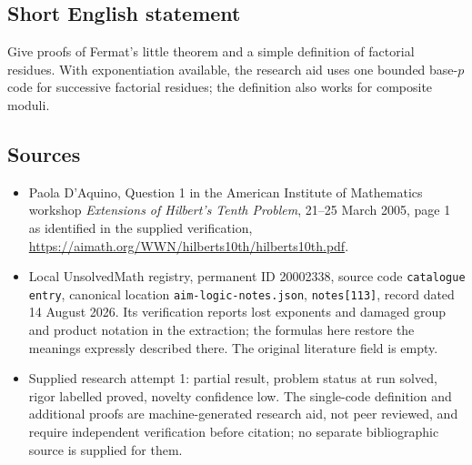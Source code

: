 \documentclass[11pt]{article}
\begin{document}
\subsection{Short English statement}
Give proofs of Fermat's little theorem and a simple definition of factorial residues. With exponentiation available, the research aid uses one bounded base-$p$ code for successive factorial residues; the definition also works for composite moduli.
\subsection{Sources}
\begin{itemize}
\item Paola D'Aquino, Question 1 in the American Institute of Mathematics workshop \emph{Extensions of Hilbert's Tenth Problem}, 21--25 March 2005, page 1 as identified in the supplied verification, \url{https://aimath.org/WWN/hilberts10th/hilberts10th.pdf}.
\item Local UnsolvedMath registry, permanent ID 20002338, source code \texttt{catalogue entry}, canonical location \texttt{aim-logic-notes.json}, \texttt{notes[113]}, record dated 14 August 2026. Its verification reports lost exponents and damaged group and product notation in the extraction; the formulas here restore the meanings expressly described there. The original literature field is empty.
\item Supplied research attempt 1: partial result, problem status at run solved, rigor labelled proved, novelty confidence low. The single-code definition and additional proofs are machine-generated research aid, not peer reviewed, and require independent verification before citation; no separate bibliographic source is supplied for them.
\end{itemize}
\end{document}
